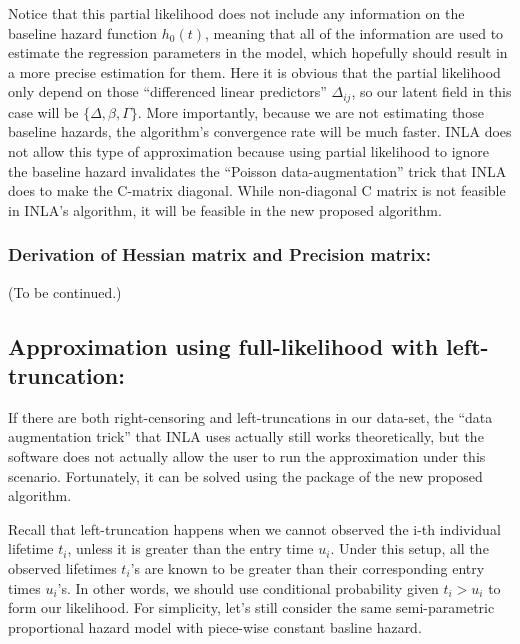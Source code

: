 \documentclass[]{article}
\begin{document}
Notice that this partial likelihood does not include any information on
the baseline hazard function \(h_0(t)\), meaning that all of the
information are used to estimate the regression parameters in the model,
which hopefully should result in a more precise estimation for them.
Here it is obvious that the partial likelihood only depend on those
``differenced linear predictors'' \(\Delta_{ij}\), so our latent field
in this case will be \(\{ \Delta,\beta,\Gamma \}\). More importantly,
because we are not estimating those baseline hazards, the algorithm's
convergence rate will be much faster. INLA does not allow this type of
approximation because using partial likelihood to ignore the baseline
hazard invalidates the ``Poisson data-augmentation'' trick that INLA
does to make the C-matrix diagonal. While non-diagonal C matrix is not
feasible in INLA's algorithm, it will be feasible in the new proposed
algorithm.

\hypertarget{derivation-of-hessian-matrix-and-precision-matrix}{%
\subsubsection{Derivation of Hessian matrix and Precision
matrix:}\label{derivation-of-hessian-matrix-and-precision-matrix}}

(To be continued.)

\hypertarget{approximation-using-full-likelihood-with-left-truncation}{%
\subsection{Approximation using full-likelihood with
left-truncation:}\label{approximation-using-full-likelihood-with-left-truncation}}

If there are both right-censoring and left-truncations in our data-set,
the ``data augmentation trick'' that INLA uses actually still works
theoretically, but the software does not actually allow the user to run
the approximation under this scenario. Fortunately, it can be solved
using the package of the new proposed algorithm.

Recall that left-truncation happens when we cannot observed the i-th
individual lifetime \(t_i\), unless it is greater than the entry time
\(u_i\). Under this setup, all the observed lifetimes \(t_i\)'s are
known to be greater than their corresponding entry times \(u_i\)'s. In
other words, we should use conditional probability given \(t_i > u_i\)
to form our likelihood. For simplicity, let's still consider the same
semi-parametric proportional hazard model with piece-wise constant
basline hazard.
\end{document}
